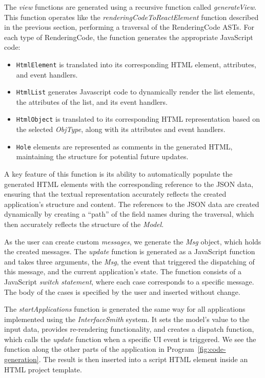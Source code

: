 The \emph{view} functions are generated using a recursive function called \emph{generateView}.
This function operates like the \emph{renderingCodeToReactElement} function described in the previous section,
performing a traversal of the RenderingCode ASTs.
For each type of RenderingCode, the function generates the appropriate JavaScript code:
\begin{itemize}
	\item \texttt{HtmlElement} is translated into its corresponding HTML element, attributes, and event handlers.
	\item \texttt{HtmlList} generates Javascript code to dynamically render the list elements, the attributes of the list, and its event handlers.
	\item \texttt{HtmlObject} is translated to its corresponding HTML representation based on the selected \emph{ObjType}, along with its attributes and event handlers.
	\item \texttt{Hole} elements are represented as comments in the generated HTML, maintaining the structure for potential future updates.
\end{itemize}
\noindent A key feature of this function is its ability to automatically populate the generated HTML elements with the corresponding reference to the JSON data,
ensuring that the textual representation accurately reflects the created application's structure and content.
The references to the JSON data are created dynamically by creating a ``path'' of the field names during the traversal, which then accurately reflects the structure of the \emph{Model}.

As the user can create custom \emph{messages}, we generate the \emph{Msg} object, which holds the created messages.
The \emph{update} function is generated as a JavaScript function and takes three arguments, the \emph{Msg}, the event that triggered the dispatching of this message, and the current application's state.
The function consists of a JavaScript \emph{switch statement}, where each case corresponds to a specific message.
The body of the cases is specified by the user and inserted without change.

The \emph{startApplications} function is generated the same way for all applications implemented using the \emph{InterfaceSmith} system.
It sets the model's value to the input data, provides re-rendering functionality, and creates a dispatch function, which calls the \emph{update} function when a specific UI event is triggered.
We see the function along the other parts of the application in Program~\ref{fig:code-generation}.
The result is then inserted into a script HTML element inside an HTML project template.

